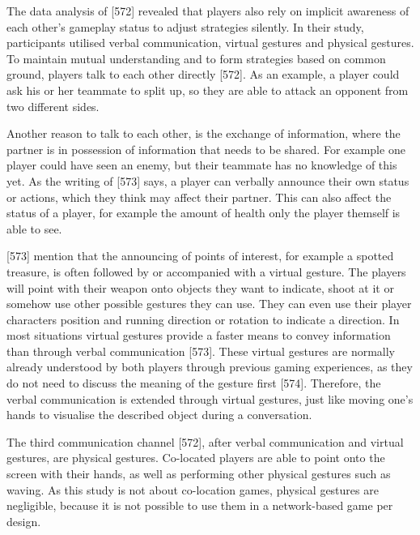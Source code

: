 The data analysis of \textcite{Cheung2012CommunicationGaming}[572] revealed that players also rely on implicit awareness of each other’s gameplay status to adjust strategies silently. In their study, participants utilised verbal communication, virtual gestures and physical gestures.
To maintain mutual understanding and to form strategies based on common ground, players talk to each other directly \autocite{Cheung2012CommunicationGaming}[572]. As an example, a player could ask his or her teammate to split up, so they are able to attack an opponent from two different sides.

Another reason to talk to each other, is the exchange of information, where the partner is in possession of information that needs to be shared. For example one player could have seen an enemy, but their teammate has no knowledge of this yet. As the writing of \textcite{Cheung2012CommunicationGaming}[573] says, a player can verbally announce their own status or actions, which they think may affect their partner. This can also affect the status of a player, for example the amount of health only the player themself is able to see.

\textcite{Cheung2012CommunicationGaming}[573] mention that the announcing of points of interest, for example a spotted treasure, is often followed by or accompanied with a virtual gesture. The players will point with their weapon onto objects they want to indicate, shoot at it or somehow use other possible gestures they can use. They can even use their player characters position and running direction or rotation to indicate a direction.
In most situations virtual gestures provide a faster means to convey information than through verbal communication \autocite{Cheung2012CommunicationGaming}[573]. These virtual gestures are normally already understood by both players through previous gaming experiences, as they do not need to discuss the meaning of the gesture first \autocite{Cheung2012CommunicationGaming}[574].
Therefore, the verbal communication is extended through virtual gestures, just like moving one's hands to visualise the described object during a conversation.


The third communication channel \textcite{Cheung2012CommunicationGaming}[572], after verbal communication and virtual gestures, are physical gestures. Co-located players are able to point onto the screen with their hands, as well as performing other physical gestures such as waving. As this study is not about co-location games, physical gestures are negligible, because it is not possible to use them in a network-based game per design.


